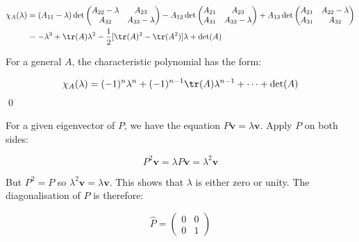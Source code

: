 \documentclass[12pt]{article}
\begin{document}

\begin{equation}
    \begin{split}
        \chi_{A}(\lambda)
        &=
        (A_{11} - \lambda)
        \det\begin{pmatrix}
            A_{22} - \lambda & A_{23}           \\
            A_{32}           & A_{33} - \lambda
        \end{pmatrix}
        -
        A_{12}
        \det\begin{pmatrix}
            A_{21} & A_{23}           \\
            A_{31} & A_{33} - \lambda
        \end{pmatrix}
        +
        A_{13}
        \det\begin{pmatrix}
            A_{21} & A_{22} - \lambda \\
            A_{31} & A_{32}
        \end{pmatrix} \\
        &= -\lambda^{3} + \tr(A)\lambda^{2} - \frac{1}{2}[\tr(A)^{2} - \tr(A^{2})] \lambda + \det(A)
    \end{split}
\end{equation}

For a general $A$, the characteristic polynomial has the form:

\begin{equation}
    \chi_{A}(\lambda) = (-1)^{n} \lambda^{n} + (-1)^{n-1} \tr(A) \lambda^{n-1} + \dots + \det(A)
\end{equation}
\qed



For a given eigenvector of $P$, we have the equation $P \mathbf{v} = \lambda \mathbf{v}$. Apply $P$ on both sides:

\begin{equation}
    P^{2} \mathbf{v} = \lambda P \mathbf{v} = \lambda^{2} \mathbf{v}
\end{equation}

But $P^{2} = P$ so $\lambda^{2} \mathbf{v} = \lambda \mathbf{v}$. This shows that $\lambda$ is either zero or unity. The diagonalisation of $P$ is therefore:

\begin{equation}
    \hat{P} = \begin{pmatrix}
        0 & 0 \\
        0 & 1
    \end{pmatrix}
\end{equation}
\end{document}
